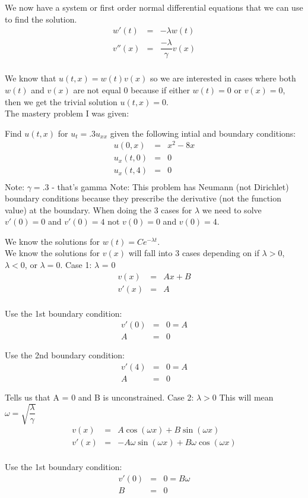 \documentclass{article}
\newcommand{\bea}{\begin{eqnarray*}}
\newcommand{\eea}{\end{eqnarray*}}
\begin{document}
We now have a system or first order normal differential equations that we can use to find the solution.
\bea
w'(t) &=& -\lambda w(t) \\
v''(x) &=& \dfrac{-\lambda}{\gamma}v(x) \\
\eea

We know that $u(t,x) = w(t)v(x)$ so we are interested in cases where both $w(t)$ and $v(x)$ are not equal 0 because if either $w(t)=0$ or $v(x)=0$, then we get the trivial solution $u(t,x) = 0$.\\

The mastery problem I was given: \newline

Find $u(t,x)$ for $u_t=.3u_{xx}$ given the following intial and boundary conditions:
\bea
u(0,x)&=&x^2-8x\\
u_x(t,0)&=&0\\
u_x(t,4)&=&0\\
\eea
Note: $\gamma=.3$ - that's gamma \newline
Note: This problem has Neumann (not Dirichlet) boundary conditions because they prescribe the derivative (not the function value) at the boundary. When doing the 3 cases for $\lambda$ we need to solve $v'(0)=0$ and $v'(0)=4$ not $v(0)=0$ and $v(0)=4$.\newline

We know the solutions for $w(t)=Ce^{-\lambda t}$. \\

We know the solutions for $v(x)$ will fall into 3 cases depending on if $\lambda > 0$, $\lambda < 0$, or $\lambda = 0$. \newline
Case 1: $\lambda$ = 0 
\bea
v(x) &=& Ax+B\\
v'(x) &=& A\\
\eea

Use the 1st boundary condition:
\bea
v'(0) &=& 0 = A\\
A &=& 0
\eea

Use the 2nd boundary condition:
\bea
v'(4) &=& 0 = A\\
A &=& 0
\eea

Tells us that A = 0 and B is unconstrained.\newline
Case 2: $\lambda > 0$ This will mean $\omega=\sqrt{\dfrac{\lambda}{\gamma}}$
\bea
v(x) &=& A\cos(\omega x)+B\sin(\omega x) \\
v'(x) &=& -A\omega \sin(\omega x)+B\omega \cos(\omega x)  \\
\eea

Use the 1st boundary condition:
\bea
v'(0) &=& 0 = B\omega\\
B &=& 0
\eea
\end{document}
